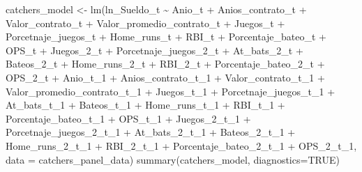 \documentclass[
]{article}
\newenvironment{Shaded}{\begin{snugshade}}{\end{snugshade}}
\newcommand{\AttributeTok}[1]{\textcolor[rgb]{0.77,0.63,0.00}{#1}}
\newcommand{\ConstantTok}[1]{\textcolor[rgb]{0.00,0.00,0.00}{#1}}
\newcommand{\FunctionTok}[1]{\textcolor[rgb]{0.00,0.00,0.00}{#1}}
\newcommand{\NormalTok}[1]{#1}
\newcommand{\OtherTok}[1]{\textcolor[rgb]{0.56,0.35,0.01}{#1}}
\newcommand{\SpecialCharTok}[1]{\textcolor[rgb]{0.00,0.00,0.00}{#1}}
\begin{document}
\begin{Shaded}
\begin{Highlighting}[]
\NormalTok{catchers\_model }\OtherTok{\textless{}{-}} \FunctionTok{lm}\NormalTok{(ln\_Sueldo\_t }\SpecialCharTok{\textasciitilde{}}\NormalTok{ Anio\_t }\SpecialCharTok{+}\NormalTok{ Anios\_contrato\_t }\SpecialCharTok{+}\NormalTok{ Valor\_contrato\_t }\SpecialCharTok{+}\NormalTok{ Valor\_promedio\_contrato\_t }\SpecialCharTok{+}\NormalTok{ Juegos\_t }\SpecialCharTok{+}\NormalTok{ Porcetnaje\_juegos\_t}
                                 \SpecialCharTok{+}\NormalTok{ Home\_runs\_t }\SpecialCharTok{+}\NormalTok{ RBI\_t }\SpecialCharTok{+}\NormalTok{ Porcentaje\_bateo\_t }\SpecialCharTok{+}\NormalTok{ OPS\_t }\SpecialCharTok{+}\NormalTok{ Juegos\_2\_t }\SpecialCharTok{+}\NormalTok{ Porcetnaje\_juegos\_2\_t}
                                 \SpecialCharTok{+}\NormalTok{ At\_bats\_2\_t }\SpecialCharTok{+}\NormalTok{ Bateos\_2\_t }\SpecialCharTok{+}\NormalTok{ Home\_runs\_2\_t }\SpecialCharTok{+}\NormalTok{ RBI\_2\_t }\SpecialCharTok{+}\NormalTok{ Porcentaje\_bateo\_2\_t }\SpecialCharTok{+}\NormalTok{ OPS\_2\_t }\SpecialCharTok{+}\NormalTok{ Anio\_t\_1 }\SpecialCharTok{+}\NormalTok{ Anios\_contrato\_t\_1}
                                 \SpecialCharTok{+}\NormalTok{ Valor\_contrato\_t\_1 }\SpecialCharTok{+}\NormalTok{ Valor\_promedio\_contrato\_t\_1 }\SpecialCharTok{+}\NormalTok{ Juegos\_t\_1 }\SpecialCharTok{+}\NormalTok{ Porcetnaje\_juegos\_t\_1 }\SpecialCharTok{+}\NormalTok{ At\_bats\_t\_1 }\SpecialCharTok{+}\NormalTok{ Bateos\_t\_1}
                                 \SpecialCharTok{+}\NormalTok{ Home\_runs\_t\_1 }\SpecialCharTok{+}\NormalTok{ RBI\_t\_1 }\SpecialCharTok{+}\NormalTok{ Porcentaje\_bateo\_t\_1 }\SpecialCharTok{+}\NormalTok{ OPS\_t\_1 }\SpecialCharTok{+}\NormalTok{ Juegos\_2\_t\_1 }\SpecialCharTok{+}\NormalTok{ Porcetnaje\_juegos\_2\_t\_1 }\SpecialCharTok{+}\NormalTok{ At\_bats\_2\_t\_1}
                                 \SpecialCharTok{+}\NormalTok{ Bateos\_2\_t\_1 }\SpecialCharTok{+}\NormalTok{ Home\_runs\_2\_t\_1 }\SpecialCharTok{+}\NormalTok{ RBI\_2\_t\_1 }\SpecialCharTok{+}\NormalTok{ Porcentaje\_bateo\_2\_t\_1 }\SpecialCharTok{+}\NormalTok{ OPS\_2\_t\_1, }\AttributeTok{data =}\NormalTok{ catchers\_panel\_data)}
\FunctionTok{summary}\NormalTok{(catchers\_model, }\AttributeTok{diagnostics=}\ConstantTok{TRUE}\NormalTok{)}
\end{Highlighting}
\end{Shaded}
\end{document}
